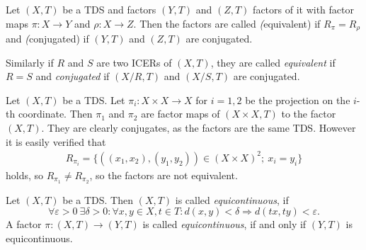\begin{definition}
	Let $(X, T)$ be a TDS and factors $(Y, T)$ and $(Z, T)$ factors of it with factor maps $\pi: X \to Y$ and $\rho: X \to Z$.	Then the factors are called \emph(equivalent) if $R_\pi = R_\rho$ and \emph(conjugated) if $(Y, T)$ and $(Z, T)$ are conjugated.
	
	Similarly if $R$ and $S$ are two ICERs of $(X, T)$, they are called \emph{equivalent} if $R = S$ and \emph{conjugated} if $(X/R, T)$ and $(X/S, T)$ are conjugated.
\end{definition}

\begin{example}
	Let $(X, T)$ be a TDS. Let $\pi_i: X \times X \to X$ for $i = 1, 2$ be the projection on the $i$-th coordinate. Then $\pi_1$ and $\pi_2$ are factor maps of $(X \times X, T)$ to the factor $(X, T)$. They are clearly conjugates, as the factors are the same TDS. However it is easily verified that
	\begin{align*}
		R_{\pi_i} = \{((x_1, x_2), (y_1, y_2)) \in (X \times X)^2;\ x_i = y_i\}
	\end{align*}
	holds, so $R_{\pi_1} \neq R_{\pi_2}$, so the factors are not equivalent.
\end{example}

\begin{definition}
	Let $(X,T)$ be a TDS. Then $(X,T)$ is called \emph{equicontinuous}, if
	\begin{equation*}
		\forall \varepsilon > 0\ \exists \delta > 0: \forall x , y \in X, t \in T:  d(x, y) < \delta  \Rightarrow d(tx, ty) < \varepsilon.
	\end{equation*}
	A factor $\pi : (X,T) \to (Y,T)$ is called \emph{equicontinuous}, if and only if $(Y,T)$ is equicontinuous.
\end{definition}

